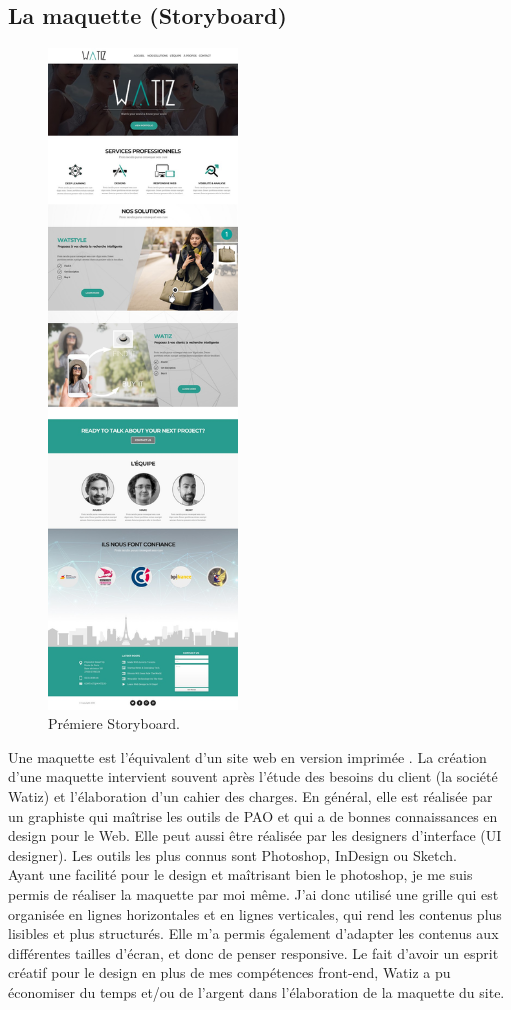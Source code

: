\documentclass[a4paper, 12pt]{report}
\begin{document}
\subsection{La maquette (Storyboard)}\label{subsec:MA}
\begin{figure}
\captionsetup{font=small}
\centering
\includegraphics[height=17.5cm]{images/StoryBoard1.jpg}
\caption{\label{fig:4.8}Prémiere Storyboard.}
\end{figure}
Une maquette est l’équivalent d’un site web en version imprimée \cite{3}. La création d’une maquette intervient souvent après l’étude des besoins du client (la société Watiz) et l’élaboration d’un cahier des charges.
En général, elle est réalisée par un graphiste qui maîtrise les outils de PAO et qui a de bonnes connaissances en design pour le Web. Elle peut aussi être réalisée par les designers d’interface (UI designer). Les outils les plus connus sont Photoshop, InDesign ou Sketch.\\
Ayant une facilité pour le design et maîtrisant bien le photoshop, je me suis permis de réaliser la maquette par moi même. J’ai donc utilisé une grille qui est organisée en lignes horizontales et en lignes verticales, qui rend les contenus plus lisibles et plus structurés. Elle m'a permis également d’adapter les contenus aux différentes tailles d’écran, et donc de penser responsive. Le fait d'avoir un esprit créatif pour le design en plus de mes compétences front-end, Watiz a pu économiser du temps et/ou de l'argent dans l'élaboration de la maquette du site.
\end{document}
